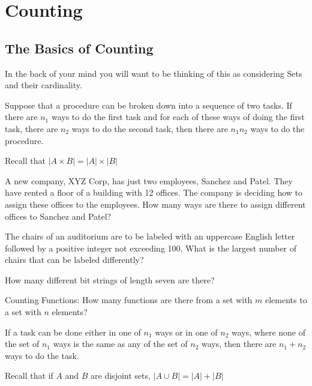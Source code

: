 \section{Counting}
\subsection{The Basics of Counting}
 In the back of your mind you will want to be thinking of this as considering Sets and their cardinality.

\begin{defn}
    Suppose that a procedure can be broken down into a sequence of two tasks. If there are $n_1$ ways to do the first task and for each of these ways of doing the first task, there are $n_2$ ways to do the second task, then there are $n_1 n_2$ ways to do the procedure.
\end{defn}
\begin{exmp} Recall that $|A\times B|=|A|\times |B|$
\end{exmp}
\begin{exmp}
    A new company, XYZ Corp, has just two employees, Sanchez and Patel. They have rented a floor of a building with 12 offices. The company is deciding how to assign these offices to the employees. How many ways are there to assign different offices to Sanchez and Patel?
    
    \vspace{2cm}
\end{exmp}
\begin{exmp}
    The chairs of an auditorium are to be labeled with an uppercase English letter followed by a positive integer not exceeding 100. What is the largest number of chairs that can be labeled differently?
    \vspace{2cm}
\end{exmp}
\begin{exmp}
    How many different bit strings of length seven are there?
    \vspace{2cm}
\end{exmp}
\begin{exmp}
    Counting Functions: How many functions are there from a set with $m$ elements to a set with $n$ elements?
    \vspace{2cm}
\end{exmp}
\begin{defn}
    If a task can be done either in one of $n_1$ ways or in one of $n_2$ ways, where none of the set of $n_1$ ways is the same as any of the set of $n_2$ ways, then there are $n_1 + n_2$ ways to do the task.
\end{defn}
\begin{exmp} Recall that if $A$ and $B$ are disjoint sets,  $|A\cup B|=|A|+|B|$
\end{exmp}

